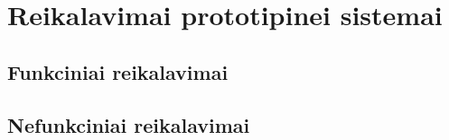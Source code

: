 \section{Reikalavimai prototipinei sistemai}
\subsection{Funkciniai reikalavimai}
\subsection{Nefunkciniai reikalavimai}